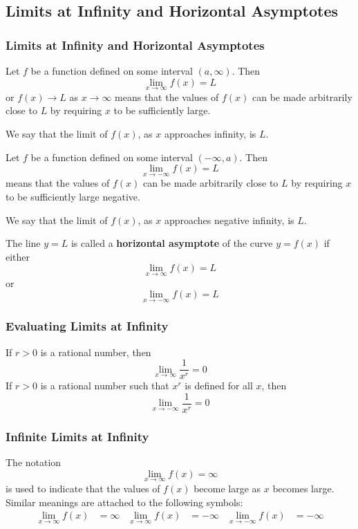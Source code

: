 \subsection{Limits at Infinity and Horizontal Asymptotes}

\subsubsection*{Limits at Infinity and Horizontal Asymptotes}
\begin{definition}
    Let \(f\) be a function defined on some interval \((a,\infty)\).
    Then
    \[\lim_{x\to\infty}f(x)=L\]
    or \(f(x)\to L\) as \(x\to\infty\) means that the values of \(f(x)\) can
    be made arbitrarily close to \(L\) by requiring \(x\) to be sufficiently
    large.
\end{definition}
We say that the limit of \(f(x)\),
as \(x\) approaches infinity,
is \(L\).
\begin{definition}
    Let \(f\) be a function defined on some interval \((-\infty,a)\).
    Then
    \[\lim_{x\to-\infty}f(x)=L\]
    means that the values of \(f(x)\) can be made arbitrarily close to \(L\) by requiring
    \(x\) to be sufficiently large negative.
\end{definition}
We say that the limit of \(f(x)\),
as \(x\) approaches negative infinity,
is \(L\).
\begin{definition}
    The line \(y=L\) is called a \textbf{horizontal asymptote} of the curve
    \(y=f(x)\) if either
    \[\lim_{x\to\infty}f(x)=L\]
    or
    \[\lim_{x\to-\infty}f(x)=L\]
\end{definition}

\subsubsection*{Evaluating Limits at Infinity}
\begin{theorem}
    If \(r>0\) is a rational number,
    then
    \[\lim_{x\to\infty}\frac{1}{x^r}=0\]
    If \(r>0\) is a rational number such that \(x^r\) is defined for all \(x\),
    then
    \[\lim_{x\to-\infty}\frac{1}{x^r}=0\]
\end{theorem}

\subsubsection*{Infinite Limits at Infinity}
The notation
\[\lim_{x\to\infty}f(x)=\infty\]
is used to indicate that the values of \(f(x)\) become large as \(x\) becomes
large.
Similar meanings are attached to the following symbols:
\begin{align*}
    \lim_{x\to\infty}f(x) &= \infty & \lim_{x\to\infty}f(x) &= -\infty
    & \lim_{x\to-\infty}f(x) &= -\infty
\end{align*}

